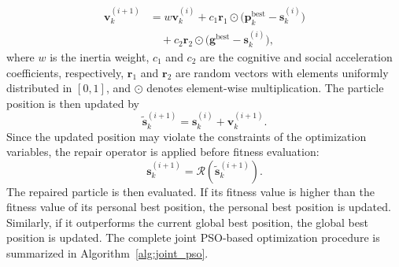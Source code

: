 \documentclass[conference]{IEEEtran}
\begin{document}
\begin{equation}
\begin{aligned}
\mathbf{v}_k^{(i+1)} &= w\mathbf{v}_k^{(i)}
  + c_1\mathbf{r}_1 \odot \big( \mathbf{p}_k^{\mathrm{best}}-\mathbf{s}_k^{(i)} \big) \\
&\quad + c_2\mathbf{r}_2 \odot \big( \mathbf{g}^{\mathrm{best}}-\mathbf{s}_k^{(i)} \big),
\end{aligned}
\label{eq:pso_velocity}
\end{equation}
where $w$ is the inertia weight, $c_1$ and $c_2$ are the cognitive and social acceleration coefficients, respectively, $\mathbf{r}_1$ and $\mathbf{r}_2$ are random vectors with elements uniformly distributed in $[0,1]$, and $\odot$ denotes element-wise multiplication. The particle position is then updated by 
\begin{equation} \tilde{\mathbf{s}}_k^{(i+1)} = \mathbf{s}_k^{(i)} + \mathbf{v}_k^{(i+1)}. 
\label{eq:pso_position} 
\end{equation} 
Since the updated position may violate the constraints of the optimization variables, the repair operator is applied before fitness evaluation: \begin{equation} \mathbf{s}_k^{(i+1)} = \mathcal{R} \left( \tilde{\mathbf{s}}_k^{(i+1)} \right). 
\label{eq:pso_repair} 
\end{equation} 
The repaired particle is then evaluated. If its fitness value is higher than the fitness value of its personal best position, the personal best position is updated. Similarly, if it outperforms the current global best position, the global best position is updated. The complete joint PSO-based optimization procedure is summarized in Algorithm~\ref{alg:joint_pso}. 
\end{document}
